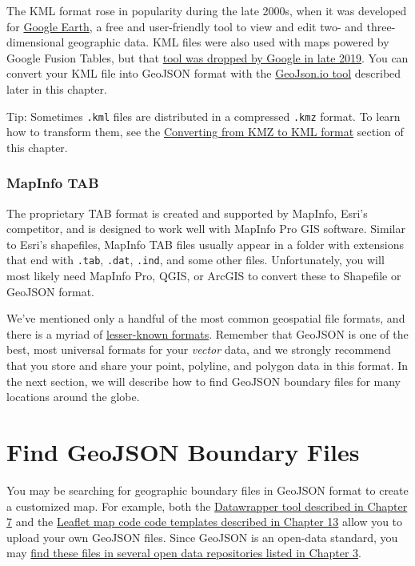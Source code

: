 \documentclass[
  english,
]{book}
\begin{document}
The KML format rose in popularity during the late 2000s, when it was developed for \href{https://www.google.com/earth/}{Google Earth}, a free and user-friendly tool to view and edit two- and three-dimensional geographic data. KML files were also used
with maps powered by Google Fusion Tables, but that \href{https://killedbygoogle.com/}{tool was dropped by Google in late 2019}.
You can convert your KML file into GeoJSON format with the \href{geojsonio.html}{GeoJson.io tool} described later in this chapter.

Tip: Sometimes \texttt{.kml} files are distributed in a compressed \texttt{.kmz} format. To learn how to transform them, see the \href{convert-kmz.html}{Converting from KMZ to KML format} section of this chapter.

\hypertarget{mapinfo-tab}{%
\subsubsection*{MapInfo TAB}\label{mapinfo-tab}}

The proprietary TAB format is created and supported by MapInfo, Esri's competitor, and is designed to work well with MapInfo Pro
GIS software. Similar to Esri's shapefiles, MapInfo TAB files usually appear in a folder with extensions that end with \texttt{.tab}, \texttt{.dat}, \texttt{.ind}, and some other files. Unfortunately, you will most likely need MapInfo Pro, QGIS, or ArcGIS to convert these to Shapefile or GeoJSON format.

We've mentioned only a handful of the most common geospatial file formats, and there is a myriad of \href{https://en.wikipedia.org/wiki/GIS_file_formats}{lesser-known formats}. Remember that GeoJSON is one of the best, most universal formats for your \emph{vector} data,
and we strongly recommend that you store and share your point, polyline, and polygon data in this format.
In the next section, we will describe how to find GeoJSON boundary files for many locations around the globe.

\hypertarget{find-geojson}{%
\section*{Find GeoJSON Boundary Files}\label{find-geojson}}

You may be searching for geographic boundary files in GeoJSON format to create a customized map. For example, both the \href{choropleth-datawrapper.html}{Datawrapper tool described in Chapter 7} and the \href{leaflet.html}{Leaflet map code code templates described in Chapter 13} allow you to upload your own GeoJSON files. Since GeoJSON is an open-data standard, you may \href{opendata.html}{find these files in several open data repositories listed in Chapter 3}.
\end{document}
